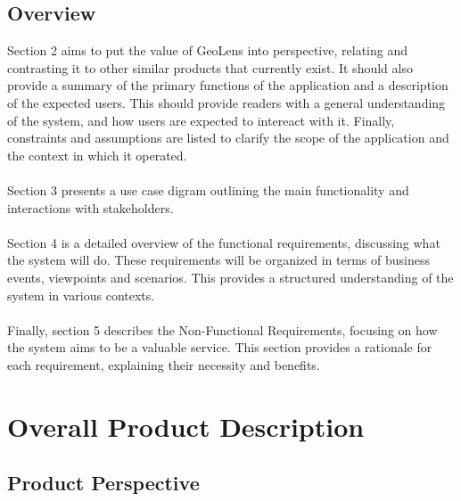 \documentclass[]{article}
\begin{document}
\subsection{Overview}
\label{sub:overview}
Section 2 aims to put the value of GeoLens into perspective, relating and contrasting it to other similar products that currently exist.
It should also provide a summary of the primary functions of the application and a description of the expected users. This should provide readers with a general understanding
of the system, and how users are expected to intereact with it. Finally, constraints and assumptions are listed to clarify the scope of the application and the context in which it operated.\\\\
Section 3 presents a use case digram outlining the main functionality and interactions with stakeholders.\\\\
Section 4 is a detailed overview of the functional requirements, discussing what the system will do. These requirements will be organized in terms of 
business events, viewpoints and scenarios. This provides a structured understanding of the system in various contexts. \\\\
Finally, section 5 describes the Non-Functional Requirements, focusing on how the system aims to be a valuable service. This section provides a rationale for each requirement, explaining their necessity and benefits.


\section{Overall Product Description}
\label{sec:overall_description}



\subsection{Product Perspective}
\label{sub:product_perspective}
\end{document}
